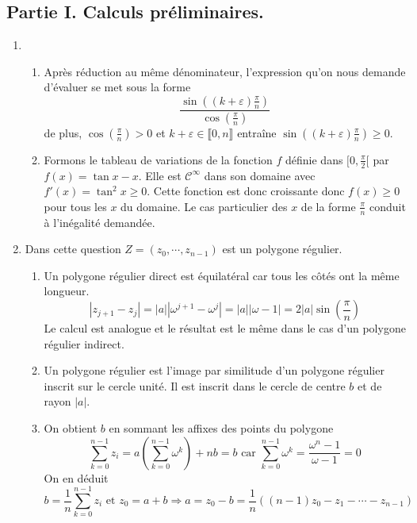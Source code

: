 \subsection*{Partie I. Calculs préliminaires.}
\begin{enumerate}
 \item 
\begin{enumerate}
 \item Après réduction au même dénominateur, l'expression qu'on nous demande d'évaluer se met sous la forme
\begin{displaymath}
 \frac{\sin\left( (k+\varepsilon)\frac{\pi}{n}\right) }{\cos\left(\frac{\pi}{n} \right) }
\end{displaymath}
de plus, $\cos\left(\frac{\pi}{n} \right) >0$ et $k+\varepsilon \in \llbracket 0,n \rrbracket$ entraîne $\sin\left( (k+\varepsilon)\frac{\pi}{n}\right)\geq 0$.
 \item Formons le tableau de variations de la fonction $f$ définie dans $[0,\frac{\pi}{2}[$ par $f(x)= \tan x -x$. Elle est $\mathcal{C}^\infty$ dans son domaine avec $f'(x) = \tan^2x\geq 0$. Cette fonction est donc croissante donc $f(x)\geq 0$ pour tous les $x$ du domaine. Le cas particulier des $x$ de la forme $\frac{\pi}{n}$ conduit à l'inégalité demandée. 
\end{enumerate}

 \item Dans cette question $Z = (z_0,\cdots, z_{n-1})$ est un polygone régulier.
\begin{enumerate}
  \item Un polygone régulier direct est équilatéral car tous les côtés ont la même longueur.
\begin{displaymath}
 |z_{j+1}-z_j| = |a||\omega^{j+1}-\omega^j| = |a||\omega-1| = 2|a|\sin\left( \frac{\pi}{n}\right)   
\end{displaymath}
Le calcul est analogue et le résultat est le même dans le cas d'un polygone régulier indirect.
  \item Un polygone régulier est l'image par similitude d'un polygone régulier inscrit sur le cercle unité. Il est inscrit dans le cercle de centre $b$ et de rayon $|a|$.
  
  \item On obtient $b$ en sommant les affixes des points du polygone
\begin{displaymath}
\sum_{k=0}^{n-1}z_i = a\left( \sum_{k=0}^{n-1} \omega ^k \right) + n b = b  \text{ car } \sum_{k=0}^{n-1} \omega ^k = \frac{\omega^n -1}{\omega -1} = 0
\end{displaymath}
On en déduit
\begin{displaymath}
b = \frac{1}{n}\sum_{k=0}^{n-1}z_i \text{ et } z_0 = a  + b \Rightarrow a =z_0-b = \frac{1}{n}\left((n-1)z_0 -z_1 -\cdots -z_{n-1} \right)   
\end{displaymath}


\end{enumerate}
\end{enumerate}
